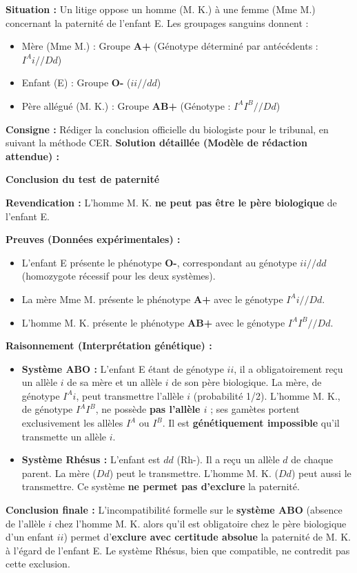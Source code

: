\documentclass[11pt]{article}
\begin{document}
\begin{exoresolu}
\textbf{Situation :} Un litige oppose un homme (M. K.) à une femme (Mme M.) concernant la paternité de l'enfant E. Les groupages sanguins donnent :
\begin{itemize}
    \item Mère (Mme M.) : Groupe \textbf{A+} (Génotype déterminé par antécédents : $I^A i // Dd$)
    \item Enfant (E) : Groupe \textbf{O-} ($ii // dd$)
    \item Père allégué (M. K.) : Groupe \textbf{AB+} (Génotype : $I^A I^B // Dd$)
\end{itemize}
\textbf{Consigne :} Rédiger la conclusion officielle du biologiste pour le tribunal, en suivant la méthode CER.
\tcblower
\textbf{Solution détaillée (Modèle de rédaction attendue) :}

\textbf{Conclusion du test de paternité}

\textbf{Revendication :} L'homme M. K. \textbf{ne peut pas être le père biologique} de l'enfant E.

\textbf{Preuves (Données expérimentales) :}
\begin{itemize}
    \item L'enfant E présente le phénotype \textbf{O-}, correspondant au génotype \textbf{$ii // dd$} (homozygote récessif pour les deux systèmes).
    \item La mère Mme M. présente le phénotype \textbf{A+} avec le génotype \textbf{$I^A i // Dd$}.
    \item L'homme M. K. présente le phénotype \textbf{AB+} avec le génotype \textbf{$I^A I^B // Dd$}.
\end{itemize}

\textbf{Raisonnement (Interprétation génétique) :}
\begin{itemize}
    \item \textbf{Système ABO :} L'enfant E étant de génotype $ii$, il a obligatoirement reçu un allèle $i$ de sa mère et un allèle $i$ de son père biologique. La mère, de génotype $I^A i$, peut transmettre l'allèle $i$ (probabilité 1/2). L'homme M. K., de génotype $I^A I^B$, ne possède \textbf{pas l'allèle $i$} ; ses gamètes portent exclusivement les allèles $I^A$ ou $I^B$. Il est \textbf{génétiquement impossible} qu'il transmette un allèle $i$.
    \item \textbf{Système Rhésus :} L'enfant est $dd$ (Rh-). Il a reçu un allèle $d$ de chaque parent. La mère ($Dd$) peut le transmettre. L'homme M. K. ($Dd$) peut aussi le transmettre. Ce système \textbf{ne permet pas d'exclure} la paternité.
\end{itemize}

\textbf{Conclusion finale :} L'incompatibilité formelle sur le \textbf{système ABO} (absence de l'allèle $i$ chez l'homme M. K. alors qu'il est obligatoire chez le père biologique d'un enfant $ii$) permet d'\textbf{exclure avec certitude absolue} la paternité de M. K. à l'égard de l'enfant E. Le système Rhésus, bien que compatible, ne contredit pas cette exclusion.
\end{exoresolu}
\end{document}
